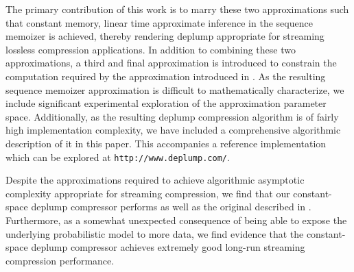 The primary contribution of this work is to marry these two approximations such that constant memory, linear time approximate inference in the sequence memoizer is achieved, thereby rendering deplump appropriate for streaming lossless compression applications.  In addition to combining these two approximations, a third and final approximation is introduced to constrain the computation required by the approximation introduced in  \citep{Gasthaus2011}. As the resulting sequence memoizer approximation is difficult to mathematically characterize, we include significant experimental exploration of the approximation parameter space.  Additionally, as the resulting deplump compression algorithm is of fairly high implementation complexity, we have included a comprehensive algorithmic description of it in this paper.  This accompanies a reference implementation which can be explored at \texttt{http://www.deplump.com/}.

Despite the approximations required to achieve algorithmic asymptotic complexity appropriate for streaming compression, we find that our constant-space deplump compressor performs as well as the original described in \citep{Gasthaus2010}.  Furthermore, as a somewhat unexpected consequence of being able to expose the underlying probabilistic model to more data, we find evidence that the constant-space deplump compressor achieves extremely good long-run streaming compression performance.